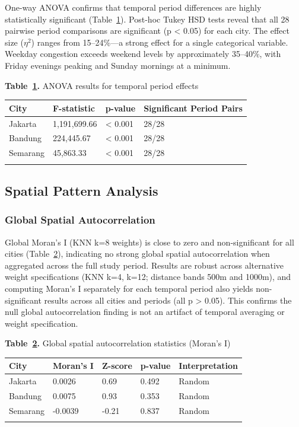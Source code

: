 \documentclass[12pt,a4paper]{article}
\begin{document}
One-way ANOVA confirms that temporal period differences are highly statistically significant (Table~\ref{tab:table_anova}). Post-hoc Tukey HSD tests reveal that all 28 pairwise period comparisons are significant (p < 0.05) for each city. The effect size ($\eta^2$) ranges from 15--24\%---a strong effect for a single categorical variable. Weekday congestion exceeds weekend levels by approximately 35--40\%, with Friday evenings peaking and Sunday mornings at a minimum.

\textbf{Table~\ref{tab:table_anova}.} ANOVA results for temporal period effects

\begin{longtable}[]{@{}llll@{}}
\toprule\noalign{}
City & F-statistic & p-value & Significant Period Pairs \\
\midrule\noalign{}
\endhead
\bottomrule\noalign{}
\endlastfoot
Jakarta & 1,191,699.66 & < 0.001 & 28/28 \\
Bandung & 224,445.67 & < 0.001 & 28/28 \\
Semarang & 45,863.33 & < 0.001 & 28/28 \\
\label{tab:table_anova}
\end{longtable}

\subsection{Spatial Pattern Analysis}

\subsubsection{Global Spatial Autocorrelation}

Global Moran's I (KNN k=8 weights) is close to zero and non-significant for all cities (Table~\ref{tab:table_moran}), indicating no strong global spatial autocorrelation when aggregated across the full study period. Results are robust across alternative weight specifications (KNN k=4, k=12; distance bands 500m and 1000m), and computing Moran's I separately for each temporal period also yields non-significant results across all cities and periods (all p > 0.05). This confirms the null global autocorrelation finding is not an artifact of temporal averaging or weight specification.

\textbf{Table~\ref{tab:table_moran}.} Global spatial autocorrelation statistics (Moran's I)

\begin{longtable}[]{@{}lllll@{}}
\toprule\noalign{}
City & Moran's I & Z-score & p-value & Interpretation \\
\midrule\noalign{}
\endhead
\bottomrule\noalign{}
\endlastfoot
Jakarta & 0.0026 & 0.69 & 0.492 & Random \\
Bandung & 0.0075 & 0.93 & 0.353 & Random \\
Semarang & -0.0039 & -0.21 & 0.837 & Random \\
\label{tab:table_moran}
\end{longtable}
\end{document}
